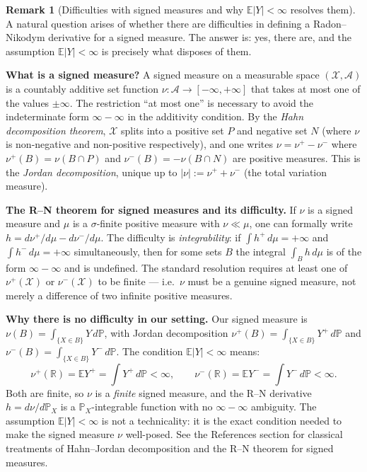\documentclass[12pt, a4paper]{article}
\theoremstyle{definition}
\newtheorem{remark}{Remark}[section]
\newcommand{\E}{\mathbb{E}}
\newcommand{\R}{\mathbb{R}}
\newcommand{\Prob}{\mathbb{P}}
\begin{document}
\begin{remark}[Difficulties with signed measures and why $\E|Y|<\infty$
  resolves them]\label{rem:signed}
A natural question arises of whether there are
difficulties in defining a Radon--Nikodym derivative for a signed
measure. The answer is: yes, there are, and the assumption
$\E|Y|<\infty$ is precisely what disposes of them.

\medskip
\textbf{What is a signed measure?}
A signed measure on a measurable space $(\mathcal{X},\mathcal{A})$
is a countably additive set function
$\nu:\mathcal{A}\to[-\infty,+\infty]$ that takes at most one of the
values $\pm\infty$.  The restriction ``at most one'' is necessary to
avoid the indeterminate form $\infty-\infty$ in the additivity
condition.  By the \emph{Hahn decomposition theorem}, $\mathcal{X}$
splits into a positive set $P$ and negative set $N$ (where $\nu$ is
non-negative and non-positive respectively), and one writes
$\nu=\nu^+-\nu^-$ where $\nu^+(B)=\nu(B\cap P)$ and
$\nu^-(B)=-\nu(B\cap N)$ are positive measures.
This is the \emph{Jordan decomposition}, unique up to
$|\nu|:=\nu^++\nu^-$ (the total variation measure).

\medskip
\textbf{The R--N theorem for signed measures and its difficulty.}
If $\nu$ is a signed measure and $\mu$ is a $\sigma$-finite positive
measure with $\nu\ll\mu$, one can formally write
$h=d\nu^+/d\mu - d\nu^-/d\mu$.  The difficulty is
\emph{integrability}: if $\int h^+\,d\mu=+\infty$ and
$\int h^-\,d\mu=+\infty$ simultaneously, then for some sets $B$ the
integral $\int_B h\,d\mu$ is of the form $\infty-\infty$ and is
undefined.  The standard resolution requires at least one of
$\nu^+(\mathcal{X})$ or $\nu^-(\mathcal{X})$ to be finite --- i.e.\
$\nu$ must be a genuine signed measure, not merely a difference of
two infinite positive measures.

\medskip
\textbf{Why there is no difficulty in our setting.}
Our signed measure is $\nu(B)=\int_{\{X\in B\}}Y\,d\Prob$, with
Jordan decomposition $\nu^+(B)=\int_{\{X\in B\}}Y^+\,d\Prob$ and
$\nu^-(B)=\int_{\{X\in B\}}Y^-\,d\Prob$.  The condition
$\E|Y|<\infty$ means:
\[
  \nu^+(\R)=\E Y^+=\int Y^+\,d\Prob<\infty,
  \qquad
  \nu^-(\R)=\E Y^-=\int Y^-\,d\Prob<\infty.
\]
Both are finite, so $\nu$ is a \emph{finite} signed measure, and the
R--N derivative $h=d\nu/d\Prob_X$ is a $\Prob_X$-integrable function
with no $\infty-\infty$ ambiguity.  The assumption $\E|Y|<\infty$ is
not a technicality: it is the exact condition needed to make the
signed measure $\nu$ well-posed.
See the References section for classical treatments of
Hahn--Jordan decomposition and the R--N theorem for signed measures.
\end{remark}
\end{document}
